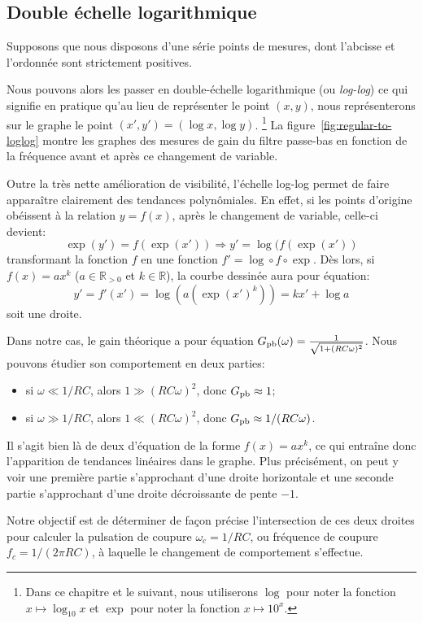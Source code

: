 \subsection{Double échelle logarithmique}
\label{subsec:approx-lin/pres/loglog}

Supposons que nous disposons d'une série points de mesures,
dont l'abcisse et l'ordonnée sont strictement positives.

Nous pouvons alors les passer
en double-échelle logarithmique (ou \emph{log-log})
ce qui signifie en pratique qu'au lieu de représenter le point $(x,y)$,
nous représenterons sur le graphe le point $(x',y') = (\log x,\log y)$.%
\footnote{
    Dans ce chapitre et le suivant, nous utiliserons
    $\log$ pour noter la fonction $x \mapsto \log_{10} x$
    et $\exp$ pour noter la fonction $x \mapsto 10^x$.
}
La figure~\ref{fig:regular-to-loglog} montre les graphes
des mesures de gain du filtre passe-bas en fonction de la fréquence
avant et après ce changement de variable.

Outre la très nette amélioration de visibilité,
l'échelle log-log permet de faire apparaître clairement
des tendances polynômiales.
En effet, si les points d'origine obéissent à la relation $y = f(x)$,
après le changement de variable, celle-ci devient:
\begin{equation}
    \exp(y') = f(\exp(x')) \Longrightarrow y' = \log(f(\exp(x'))
\end{equation}
transformant la fonction $f$ en une fonction $f' = \log\circ f\circ\exp$.
Dès lors, si $f(x) = ax^k$ ($a \in \mathbb{R}_{>0}$ et $k \in \mathbb{R}$),
la courbe dessinée aura pour équation:
\begin{equation}
    y' = f'(x') = \log(a(\exp(x')^k)) = kx'+\log a
\end{equation}
soit une droite.

Dans notre cas, le gain théorique a pour équation
$G_{\mathrm{pb}}(\omega) = \frac{1}{\sqrt{1+(RC\omega)^2}}$.
Nous pouvons étudier son comportement en deux parties:
\begin{itemize}
    \item si $\omega \ll 1/RC$, alors $1 \gg (RC\omega)^2$,
        donc $G_{\mathrm{pb}} \approx 1$;
    \item si $\omega \gg 1/RC$, alors $1 \ll (RC\omega)^2$,
        donc $G_{\mathrm{pb}} \approx 1/(RC\omega)$.
\end{itemize}

Il s'agit bien là de deux d'équation de la forme $f(x) = ax^k$,
ce qui entraîne donc l'apparition de tendances linéaires dans le graphe.
Plus précisément, on peut y voir
une première partie s'approchant d'une droite horizontale et
une seconde partie s'approchant d'une droite décroissante
de pente $-1$.

Notre objectif est de déterminer de façon précise
l'intersection de ces deux droites
pour calculer la pulsation de coupure $\omega_c=1/RC$,
ou fréquence de coupure $f_c=1/(2\pi RC)$,
à laquelle le changement de comportement s'effectue.
